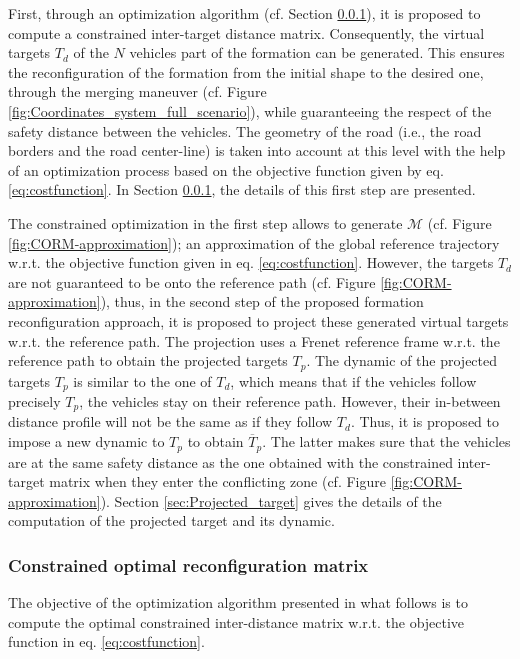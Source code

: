 First, through an optimization algorithm (cf. Section \ref{sec:CORM_optimization_alg}), it is proposed to compute a constrained inter-target distance matrix. Consequently, the virtual targets $T_d$ of the $N$ vehicles part of the formation can be generated. This ensures the reconfiguration of the formation from the initial shape to the desired one, through the merging maneuver (cf. Figure \ref{fig:Coordinates_system_full_scenario}), while guaranteeing the respect of the safety distance between the vehicles. The geometry of the road (i.e., the road borders and the road center-line) is taken into account at this level with the help of an optimization process based on the objective function given by eq. \ref{eq:costfunction}. In Section \ref{sec:CORM_optimization_alg}, the details of this first step are presented. 


The constrained optimization in the first step allows to generate $\mathcal{M}$ (cf. Figure \ref{fig:CORM-approximation}); an approximation of the global reference trajectory w.r.t. the objective function given in eq. \ref{eq:costfunction}. However, the targets $T_d$ are not guaranteed to be onto the reference path (cf. Figure \ref{fig:CORM-approximation}), thus, in the second step of the proposed formation reconfiguration approach, it is proposed to project these generated virtual targets w.r.t. the reference path. The projection uses a Frenet reference frame w.r.t. the reference path to obtain the projected targets $T_p$. The dynamic of the projected targets $T_p$ is similar to the one of $T_d$, which means that if the vehicles follow precisely $T_p$, the vehicles stay on their reference path. However, their in-between distance profile will not be the same as if they follow $T_d$. Thus, it is proposed to impose a new dynamic to $T_p$ to obtain $\overline{T}_p$. The latter makes sure that the vehicles are at the same safety distance as the one obtained with the constrained inter-target matrix when they enter the conflicting zone (cf. Figure \ref{fig:CORM-approximation}). Section \ref{sec:Projected_target} gives the details of the computation of the projected target and its dynamic. 

\subsubsection{Constrained optimal reconfiguration matrix} \label{sec:CORM_optimization_alg}
The objective of the optimization algorithm presented in what follows is to compute the optimal constrained inter-distance matrix w.r.t. the objective function in eq. \ref{eq:costfunction}. 




